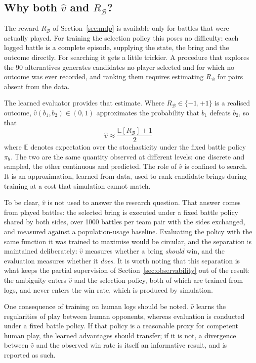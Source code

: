 \documentclass[conference]{IEEEtran}
\begin{document}
\subsection{Why both $\hat{v}$ and $R_{\mathcal{B}}$?}

The reward $R_{\mathcal{B}}$ of Section~\ref{sec:mdp} is available only for
battles that were actually played. For training the selection policy this poses
no difficulty: each logged battle is a complete episode, supplying the state,
the bring and the outcome directly. For searching it gets a little trickier. A procedure that
explores the 90 alternatives generates candidates no player selected and for
which no outcome was ever recorded, and ranking them requires estimating
$R_{\mathcal{B}}$ for pairs absent from the data.

The learned evaluator provides that estimate. Where $R_{\mathcal{B}} \in
\{-1,+1\}$ is a realised outcome, $\hat{v}(b_1,b_2) \in (0,1)$ approximates the
probability that $b_1$ defeats $b_2$, so that
\begin{equation}
    \hat{v} \approx \frac{\mathbb{E}[R_{\mathcal{B}}] + 1}{2}
\end{equation}
where $\mathbb{E}$ denotes expectation over the stochasticity under the fixed battle
policy $\pi_b$. The two are the same quantity observed at different levels: one
discrete and sampled, the other continuous and predicted.
The role of $\hat{v}$ is confined to search. It is an approximation, learned
from data, used to rank candidate brings during training at a cost that
simulation cannot match. 

To be clear, $\hat{v}$ is not used to answer the research question. That
answer comes from played battles: the selected bring is executed under a fixed
battle policy shared by both sides, over 1000 battles per team pair with the
sides exchanged, and measured against a population-usage baseline. Evaluating
the policy with the same function it was trained to maximise would be
circular, and the separation is maintained deliberately: $\hat{v}$ measures
whether a bring \emph{should} win, and the evaluation measures whether it
\emph{does}. It is worth noting that this separation is what keeps the partial
supervision of Section~\ref{sec:observability} out of the result: the
ambiguity enters $\hat{v}$ and the selection policy, both of which are trained
from logs, and never enters the win rate, which is produced by simulation.

One consequence of training on human logs should be noted. $\hat{v}$ learns
the regularities of play between human opponents, whereas evaluation is
conducted under a fixed battle policy. If that policy is a reasonable proxy for
competent human play, the learned advantages should transfer; if it is not, a
divergence between $\hat{v}$ and the observed win rate is itself an
informative result, and is reported as such.
\end{document}
